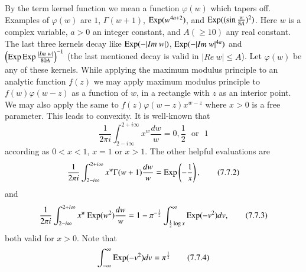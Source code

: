 By the term kernel function we mean a function $\varphi(w)$ which
tapers off. Examples of $\varphi(w)$ are $1$, $\Gamma(w+1)$,
$\operatorname{Exp}(w^{4a+2})$, and $\operatorname{Exp}((\sin \frac{w}{8A})^{2})$. Here $w$ is a
complex variable, $a>0$ an integer constant, and $A(\geq 10)$ any real
constant. The last three kernels decay like $\operatorname{Exp}(-|Im\ w|)$,
$\operatorname{Exp}(-|Im\ w|^{4a})$ and $\left(\operatorname{Exp}\operatorname{Exp}
\frac{|Im\ w|}{80A}\right)^{-1}$ (the last mentioned decay is valid in
$|Re\ w|\le A$). Let $\varphi(w)$ be any of these kernels. While
applying the maximum modulus principle to an analytic function $f(z)$
we may apply maximum modulus principle to $f(w)\varphi(w-z)$ as a
function of $w$, in a rectangle with $z$ as an interior point. We may
also apply the same to $f(z)\varphi(w-z)x^{w-z}$ where $x>0$ is a free
parameter. This leads to convexity. It is well-known that
\begin{equation*}
\frac{1}{2\pi
  i}\int^{2+i\infty}_{2-i\infty}x^{w}\frac{dw}{w}=0,\frac{1}{2}\text{~
  or~ } 1\tag{7.7.1}\label{c7:eq7.7.1}
\end{equation*}
according as $0<x<1$, $x=1$ or $x>1$. The other helpful evaluations
are
\begin{equation*}
\frac{1}{2\pi i}\int^{2+i\infty}_{2-i\infty} x^{w}\Gamma(w+1)\frac{dw}{w} =\operatorname{Exp}\left(-\frac{1}{x}\right),\tag{7.7.2}\label{c7:eq7.7.2} 
\end{equation*}
and
\begin{equation*}
\frac{1}{2\pi
  i}\int^{2+i\infty}_{2-i\infty}x^{w}\operatorname{Exp}(w^{2})\frac{dw}{w}=1-\pi^{-\frac{1}{2}}\int^{\infty}_{\frac{1}{2}\log x}\operatorname{Exp}(-v^{2})dv,\tag{7.7.3}\label{c7:eq7.7.3}
\end{equation*}
both valid for $x>0$. Note that
\begin{equation*}
\int^{\infty}_{-\infty}\operatorname{Exp}(-v^{2})dv=\pi^{\frac{1}{2}}\tag{7.7.4}\label{c7:eq7.7.4} 
\end{equation*}

